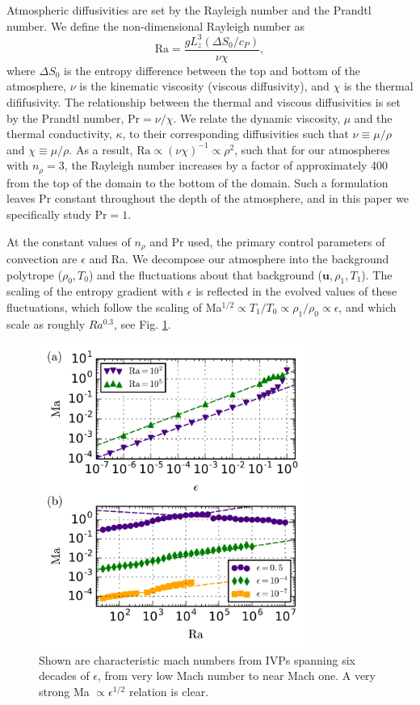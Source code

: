 \documentclass[aps, prl, twocolumn, groupedaddress]{revtex4-1}
\begin{document}
Atmospheric diffusivities are set by the Rayleigh number and the Prandtl number.  We define the
non-dimensional Rayleigh number as
\begin{equation}
\text{Ra} = \frac{g L_z^3 (\Delta S_0 / c_P)}{\nu\chi},
\end{equation}
where $\Delta S_0$ is the entropy difference between the top and bottom of the atmosphere, 
$\nu$ is the kinematic viscosity (viscous diffusivity), and $\chi$ is the thermal dififusivity.  
The relationship between the thermal and viscous diffusivities is
set by the Prandtl number, Pr$ = \nu/\chi$.   We relate the dynamic viscosity, $\mu$ and the thermal conductivity,
$\kappa$, to their corresponding diffusivities such that 
$\nu \equiv \mu/\rho$ and $\chi \equiv \mu/\rho$.  As a result, $\text{Ra} \propto (\nu\chi)^{-1} \propto
\rho^2$, such that for our atmospheres with $n_{\rho} = 3$, the Rayleigh number increases by a factor of
approximately 400 from the top of the domain to the bottom of the domain.  Such a formulation leaves Pr
constant throughout the depth of the atmosphere, and in this paper we specifically study $\text{Pr} = 1$.

At the constant values of $n_\rho$ and Pr used, the primary control parameters of convection are $\epsilon$
and Ra.  We decompose our atmosphere into the background polytrope ($\rho_{0}, T_{0}$) and the fluctuations
about that background ($\bm{u}, \rho_{1}, T_{1}$).  The scaling of the entropy gradient with $\epsilon$
is reflected in the evolved values of these fluctuations, which follow the scaling of
Ma$^{1/2} \propto T_1/T_0 \propto \rho_{1}/\rho_{0} \propto \epsilon$, and which scale as roughly $Ra^{0.3}$,
see Fig. \ref{fig:ma_v_eps}.

\begin{figure}[t]
\includegraphics[width=3.4375in]{./figs/ma_v_eps.png}
\caption{Shown are characteristic mach numbers from IVPs spanning six decades of $\epsilon$, from
very low Mach number to near Mach one.  A very strong Ma $\propto \epsilon^{1/2}$ relation is clear. 
\label{fig:ma_v_eps} }
\end{figure}
\end{document}
